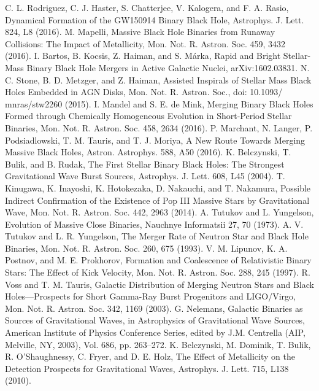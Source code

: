 \documentclass[binding=0.6cm, LaM]{sapthesis}
\begin{document}
\begin{thebibliography}{500}
 	 C. L. Rodriguez, C. J. Haster, S. Chatterjee, V. Kalogera, and F. A. Rasio, Dynamical Formation of the GW150914 Binary Black Hole, Astrophys. J. Lett. 824, L8 (2016). M. Mapelli, Massive Black Hole Binaries from Runaway Collisions: The Impact of Metallicity, Mon. Not. R. Astron. Soc. 459, 3432 (2016).
         I. Bartos, B. Kocsis, Z. Haiman, and S. Márka, Rapid and Bright Stellar-Mass Binary Black Hole Mergers in Active Galactic Nuclei, arXiv:1602.03831.
 	 N. C. Stone, B. D. Metzger, and Z. Haiman, Assisted Inspirals of Stellar Mass Black Holes Embedded in AGN Disks, Mon. Not. R. Astron. Soc., doi: 10.1093/ mnras/stw2260 (2015).
        I. Mandel and S. E. de Mink, Merging Binary Black Holes Formed through Chemically Homogeneous Evolution in Short-Period Stellar Binaries, Mon. Not. R. Astron. Soc. 458, 2634 (2016).
          P. Marchant, N. Langer, P. Podsiadlowski, T. M. Tauris, and T. J. Moriya, A New Route Towards Merging Massive Black Holes, Astron. Astrophys. 588, A50 (2016).
     K. Belczynski, T. Bulik, and B. Rudak, The First Stellar Binary Black Holes: The Strongest Gravitational Wave Burst Sources, Astrophys. J. Lett. 608, L45 (2004).
        T. Kinugawa, K. Inayoshi, K. Hotokezaka, D. Nakauchi, and T. Nakamura, Possible Indirect Confirmation of the Existence of Pop III Massive Stars by Gravitational Wave, Mon. Not. R. Astron. Soc. 442, 2963 (2014).
          A. Tutukov and L. Yungelson, Evolution of Massive Close Binaries, Nauchnye Informatsii 27, 70 (1973).
          A. V. Tutukov and L. R. Yungelson, The Merger Rate of Neutron Star and Black Hole Binaries, Mon. Not. R. Astron. Soc. 260, 675 (1993).
         V. M. Lipunov, K. A. Postnov, and M. E. Prokhorov, Formation and Coalescence of Relativistic Binary Stars: The Effect of Kick Velocity, Mon. Not. R. Astron. Soc. 288, 245 (1997).
         R. Voss and T. M. Tauris, Galactic Distribution of Merging Neutron Stars and Black Holes—Prospects for Short Gamma-Ray Burst Progenitors and LIGO/Virgo, Mon. Not. R. Astron. Soc. 342, 1169 (2003).
         G. Nelemans, Galactic Binaries as Sources of Gravitational Waves, in Astrophysics of Gravitational Wave Sources, American Institute of Physics Conference Series, edited by J.M. Centrella (AIP, Melville, NY, 2003), Vol. 686, pp. 263–272.
          K. Belczynski, M. Dominik, T. Bulik, R. O’Shaughnessy, C. Fryer, and D. E. Holz, The Effect of Metallicity on the Detection Prospects for Gravitational Waves, Astrophys. J. Lett. 715, L138 (2010).

\end{thebibliography}
\end{document}
